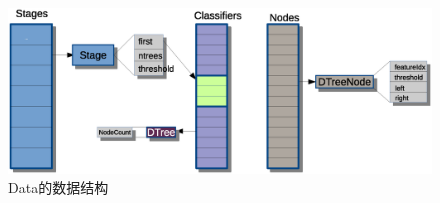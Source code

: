 \documentclass{ctexart}
\begin{document}
\begin{figure}[!htb] %
\centering
\includegraphics[scale=0.5]{graphics/data_struct.eps} %
\caption{Data的数据结构} %
\label{fig:digraph}
\end{figure}
\end{document}
